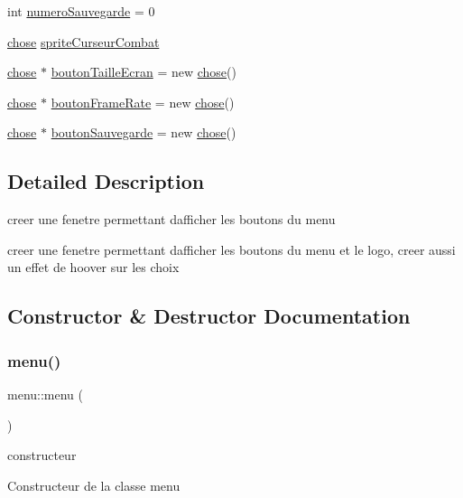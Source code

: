 \begin{DoxyCompactItemize}
\item 
int \mbox{\hyperlink{classmenu_a0a342635f789b81a24d1b5e8397327b1}{numero\+Sauvegarde}} = 0
\item 
\mbox{\hyperlink{classchose}{chose}} \mbox{\hyperlink{classmenu_ac2b4806518d75909e9d6d9fdb6ebf2dc}{sprite\+Curseur\+Combat}}
\item 
\mbox{\hyperlink{classchose}{chose}} $\ast$ \mbox{\hyperlink{classmenu_aee8418eb26372ba7964d0bd8a6c20cf8}{bouton\+Taille\+Ecran}} = new \mbox{\hyperlink{classchose}{chose}}()
\item 
\mbox{\hyperlink{classchose}{chose}} $\ast$ \mbox{\hyperlink{classmenu_a8b7d7c75aa9583ee7408e62c68a24866}{bouton\+Frame\+Rate}} = new \mbox{\hyperlink{classchose}{chose}}()
\item 
\mbox{\hyperlink{classchose}{chose}} $\ast$ \mbox{\hyperlink{classmenu_ab904094fecec2d69ecf92512dad4c2c6}{bouton\+Sauvegarde}} = new \mbox{\hyperlink{classchose}{chose}}()
\end{DoxyCompactItemize}


\subsection{Detailed Description}
creer une fenetre permettant d\textquotesingle{}afficher les boutons du menu 

creer une fenetre permettant d\textquotesingle{}afficher les boutons du menu et le logo, creer aussi un effet de hoover sur les choix 

\subsection{Constructor \& Destructor Documentation}
\mbox{\label{classmenu_ad345b60b72c4992525cf064d5642c1d9}} 
\subsubsection{\texorpdfstring{menu()}{menu()}}
{\footnotesize\ttfamily menu\+::menu (\begin{DoxyParamCaption}{ }\end{DoxyParamCaption})}



constructeur 

Constructeur de la classe menu \mbox{\label{classmenu_a5efbd22f23289b42ed68d2a9bb431f35}} 
